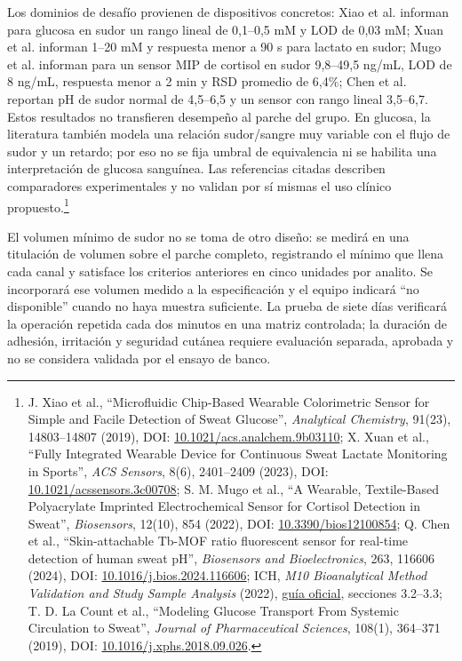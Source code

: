 Los dominios de desafío provienen de dispositivos concretos: Xiao et al. informan para glucosa en sudor un rango lineal de 0,1--0,5 mM y LOD de 0,03 mM; Xuan et al. informan 1--20 mM y respuesta menor a 90 s para lactato en sudor; Mugo et al. informan para un sensor MIP de cortisol en sudor 9,8--49,5 ng/mL, LOD de 8 ng/mL, respuesta menor a 2 min y RSD promedio de 6,4\%; Chen et al. reportan pH de sudor normal de 4,5--6,5 y un sensor con rango lineal 3,5--6,7. Estos resultados no transfieren desempeño al parche del grupo. En glucosa, la literatura también modela una relación sudor/sangre muy variable con el flujo de sudor y un retardo; por eso no se fija umbral de equivalencia ni se habilita una interpretación de glucosa sanguínea. Las referencias citadas describen comparadores experimentales y no validan por sí mismas el uso clínico propuesto.\footnote{J. Xiao et al., ``Microfluidic Chip-Based Wearable Colorimetric Sensor for Simple and Facile Detection of Sweat Glucose'', \textit{Analytical Chemistry}, 91(23), 14803--14807 (2019), DOI: \href{https://doi.org/10.1021/acs.analchem.9b03110}{10.1021/acs.analchem.9b03110}; X. Xuan et al., ``Fully Integrated Wearable Device for Continuous Sweat Lactate Monitoring in Sports'', \textit{ACS Sensors}, 8(6), 2401--2409 (2023), DOI: \href{https://doi.org/10.1021/acssensors.3c00708}{10.1021/acssensors.3c00708}; S. M. Mugo et al., ``A Wearable, Textile-Based Polyacrylate Imprinted Electrochemical Sensor for Cortisol Detection in Sweat'', \textit{Biosensors}, 12(10), 854 (2022), DOI: \href{https://doi.org/10.3390/bios12100854}{10.3390/bios12100854}; Q. Chen et al., ``Skin-attachable Tb-MOF ratio fluorescent sensor for real-time detection of human sweat pH'', \textit{Biosensors and Bioelectronics}, 263, 116606 (2024), DOI: \href{https://doi.org/10.1016/j.bios.2024.116606}{10.1016/j.bios.2024.116606}; ICH, \textit{M10 Bioanalytical Method Validation and Study Sample Analysis} (2022), \href{https://database.ich.org/sites/default/files/M10_Guideline_Step4_2022_0524.pdf}{guía oficial}, secciones 3.2--3.3; T. D. La Count et al., ``Modeling Glucose Transport From Systemic Circulation to Sweat'', \textit{Journal of Pharmaceutical Sciences}, 108(1), 364--371 (2019), DOI: \href{https://doi.org/10.1016/j.xphs.2018.09.026}{10.1016/j.xphs.2018.09.026}.}

El volumen mínimo de sudor no se toma de otro diseño: se medirá en una titulación de volumen sobre el parche completo, registrando el mínimo que llena cada canal y satisface los criterios anteriores en cinco unidades por analito. Se incorporará ese volumen medido a la especificación y el equipo indicará ``no disponible'' cuando no haya muestra suficiente. La prueba de siete días verificará la operación repetida cada dos minutos en una matriz controlada; la duración de adhesión, irritación y seguridad cutánea requiere evaluación separada, aprobada y no se considera validada por el ensayo de banco.

